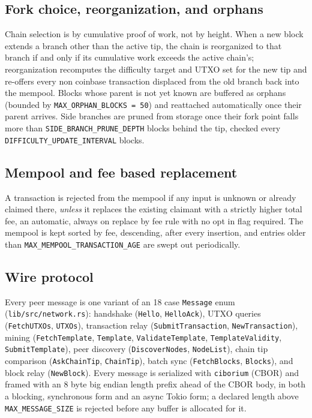 \documentclass[11pt]{article}
\newcommand{\code}[1]{\texttt{#1}}
\begin{document}
\subsection{Fork choice, reorganization, and orphans}
\label{sec:forkchoice}

Chain selection is by cumulative proof of work, not by height. When a new block extends a branch other than the active tip, the chain is reorganized to that branch if and only if its cumulative work exceeds the active chain's; reorganization recomputes the difficulty target and UTXO set for the new tip and re-offers every non coinbase transaction displaced from the old branch back into the mempool. Blocks whose parent is not yet known are buffered as orphans (bounded by \code{MAX_ORPHAN_BLOCKS = 50}) and reattached automatically once their parent arrives. Side branches are pruned from storage once their fork point falls more than \code{SIDE_BRANCH_PRUNE_DEPTH} blocks behind the tip, checked every \code{DIFFICULTY_UPDATE_INTERVAL} blocks.

\subsection{Mempool and fee based replacement}

A transaction is rejected from the mempool if any input is unknown or already claimed there, \emph{unless} it replaces the existing claimant with a strictly higher total fee, an automatic, always on replace by fee rule with no opt in flag required. The mempool is kept sorted by fee, descending, after every insertion, and entries older than \code{MAX_MEMPOOL_TRANSACTION_AGE} are swept out periodically.

\subsection{Wire protocol}

Every peer message is one variant of an 18 case \code{Message} enum (\code{lib/src/network.rs}): handshake (\code{Hello}, \code{HelloAck}), UTXO queries (\code{FetchUTXOs}, \code{UTXOs}), transaction relay (\code{SubmitTransaction}, \code{NewTransaction}), mining (\code{FetchTemplate}, \code{Template}, \code{ValidateTemplate}, \code{TemplateValidity}, \code{SubmitTemplate}), peer discovery (\code{DiscoverNodes}, \code{NodeList}), chain tip comparison (\code{AskChainTip}, \code{ChainTip}), batch sync (\code{FetchBlocks}, \code{Blocks}), and block relay (\code{NewBlock}). Every message is serialized with \code{ciborium} (CBOR) and framed with an 8 byte big endian length prefix ahead of the CBOR body, in both a blocking, synchronous form and an async Tokio form; a declared length above \code{MAX_MESSAGE_SIZE} is rejected before any buffer is allocated for it.
\end{document}
